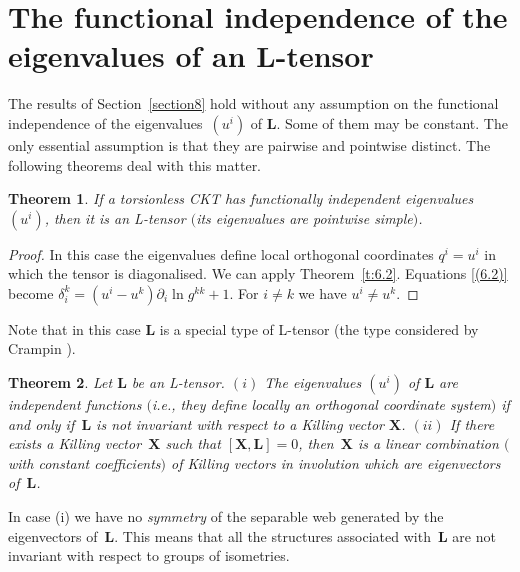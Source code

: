 \documentclass[10pt,a4paper]{amsart}
\def\bs{\boldsymbol}
\numberwithin{equation}{section}
\newtheorem{Theorem}{Theorem}[section]
 { \theoremstyle{definition}
\newtheorem{Notation}[Theorem]{Notation}
\newtheorem{Example}[Theorem]{Example}
\newtheorem{Remark}[Theorem]{Remark}
\newtheorem{Remarks}[Theorem]{Remarks}
 }
\begin{document}
\section{The functional independence of the eigenvalues of an L-tensor}\label{section9}

The results of Section~\ref{section8} hold without any assumption on the functional independence of the eigen\-va\-lues~$(u^i)$ of $\bs L$. Some of them may be constant. The only essential assumption is that they are pairwise and pointwise distinct. The following theorems deal with this matter.

\begin{Theorem}\label{t:9.1}
If a torsionless CKT has functionally independent eigenvalues $(u^i)$, then it is an L-tensor $($its eigenvalues are pointwise simple$)$.
\end{Theorem}

\begin{proof}
In this case the eigenvalues def\/ine local orthogonal coordinates $q^i=u^i$ in which the tensor is diagonalised. We can apply Theorem~\ref{t:6.2}. Equations \eqref{(6.2)} become $\delta_i^k=(u^i-u^k)\partial_i\ln g^{kk}+1$. For $i\neq k$ we have $u^i\neq u^k$.
\end{proof}

Note that in this case $\bs L$ is a special type of L-tensor (the type considered by Crampin \cite{Crampin-2003a,Crampin-2003b}).

\begin{Theorem}\label{t:9.2}
Let $\bs L$ be an L-tensor. $(i)$  The eigenvalues $(u^i)$ of $\bs L$ are independent functions $($i.e., they def\/ine locally an orthogonal coordinate system$)$ if and only if~$\bs L$ is  not invariant with respect to  a Killing vector $\bs X$. $(ii)$ If there exists a Killing vector~$\bs X$ such that $[\bs X,\bs L]=0$, then~$\bs X$ is a linear combination $($with constant coefficients$)$ of Killing vectors in involution which are eigenvectors of~$\bs L$.
\end{Theorem}

In case (i) we have no {\it symmetry} of the separable web generated by the eigenvectors of~$\bs L$. This means that all the structures associated with~$\bs L$ are not invariant with respect to  groups of isometries.
\end{document}
